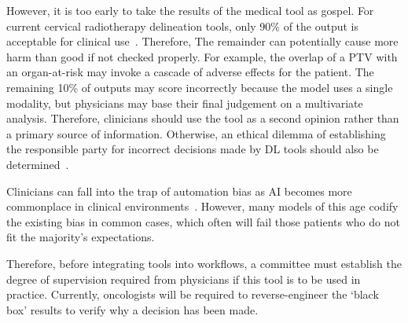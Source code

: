 \documentclass[12pt,twoside]{report}
\begin{document}
However, it is too early to take the results of the medical tool as gospel. For current cervical radiotherapy delineation tools, only 90\% of the output is acceptable for clinical use~\cite{LIU2020172}. Therefore, The remainder can potentially cause more harm than good if not checked properly. For example, the overlap of a PTV with an organ-at-risk may invoke a cascade of adverse effects for the patient. The remaining 10\% of outputs may score incorrectly because the model uses a single modality, but physicians may base their final judgement on a multivariate analysis. Therefore, clinicians should use the tool as a second opinion rather than a primary source of information. Otherwise, an ethical dilemma of establishing the responsible party for incorrect decisions made by DL tools should also be determined~\cite{Chen2021-dg}.

Clinicians can fall into the trap of automation bias as AI becomes more commonplace in clinical environments~\cite{STRAW2020101965}. However, many models of this age codify the existing bias in common cases, which often will fail those patients who do not fit the majority's expectations. 

Therefore, before integrating tools into workflows, a committee must establish the degree of supervision required from physicians if this tool is to be used in practice. Currently, oncologists will be required to reverse-engineer the `black box' results to verify why a decision has been made. 



\end{document}
